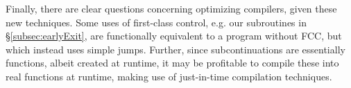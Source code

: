 \documentclass[11pt]{article}
\newcommand{\maybePage}{\newpage}
\newcommand{\letin}[2]{\textsf{let }#1\textsf{ in }#2}
\newcommand\F{\mathcal{F}}
\newcommand{\angles}[1]{\langle#1\rangle}
\begin{document}
Finally, there are clear questions concerning optimizing compilers, given these new techniques.
Some uses of first-class control, e.g. our subroutines in \S\ref{subsec:earlyExit}, are functionally equivalent to a program without FCC, but which instead uses simple jumps.
Further, since subcontinuations are essentially functions, albeit created at runtime, it may be profitable to compile these into real functions at runtime, making use of just-in-time compilation techniques.















%
%
%
%
%
%
%
%
%
\end{document}
